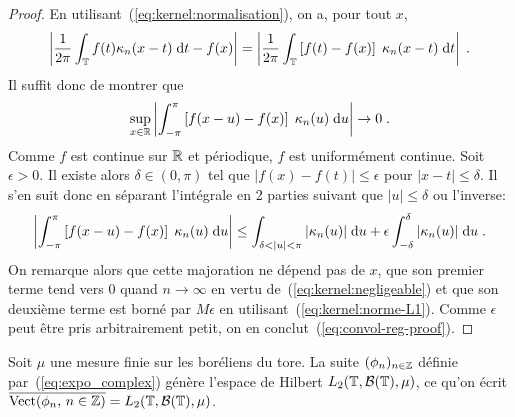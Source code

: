 \begin{proof}
  En utilisant~(\ref{eq:kernel:normalisation}), on a, pour tout $x$,
$$
\left|\frac{1}{2 \pi} \int_{\mathbb{T}} f(t) \kappa_n(x-t)\;  \mathrm{d} t - f(x)\right|
=\left|\frac{1}{2 \pi} \int_{\mathbb{T}} \left[f(t) - f(x)\right] \;\kappa_n(x-t)\;  \mathrm{d}
  t\right| \;.
$$
Il suffit donc de montrer que
\begin{equation}
\label{eq:convol-reg-proof}
\sup_{x\in\mathbb{R}}\left|\int_{-\pi}^{\pi}
\left[f(x-u) - f(x)\right] \;\kappa_n(u)\;  \mathrm{d} u\right|\to0\;.
\end{equation}
Comme $f$ est continue sur $\mathbb{R}$ et p\'{e}riodique, $f$ est uniform\'{e}ment
continue. Soit $\epsilon>0$. Il existe alors $\delta\in(0,\pi)$ tel que
$|f(x)-f(t)|\leq \epsilon$ pour $|x-t|\leq\delta$. Il s'en suit donc en
s\'{e}parant l'int\'{e}grale en 2 parties suivant que $|u|\leq\delta$ ou l'inverse:
$$
\left|\int_{-\pi}^{\pi}
\left[f(x-u) - f(x)\right] \;\kappa_n(u)\;  \rmd u\right|
\leq \int_{\delta<|u|<\pi} |\kappa_n(u)|\;  \rmd u
+ \epsilon\int_{-\delta}^\delta |\kappa_n(u)|\;  \rmd u \;.
$$
On remarque alors que cette majoration ne d\'{e}pend pas de $x$, que son premier
terme tend vers 0 quand $n\to\infty$ en vertu de~(\ref{eq:kernel:negligeable})
et que son deuxi\`{e}me terme est born\'{e} par $M\epsilon$ en
utilisant~(\ref{eq:kernel:norme-L1}). Comme $\epsilon$ peut \^{e}tre pris
arbitrairement petit, on en conclut~(\ref{eq:convol-reg-proof}).

\end{proof}
\begin{corollary}
Soit $\mu$ une mesure finie sur les bor\'{e}liens du tore.
La suite $(\phi_n)_{n\in\mathbb{Z}}$ d\'{e}finie par~(\ref{eq:expo_complex}) g\'{e}n\`{e}re
l'espace de Hilbert $L_2(\mathbb{T},\mathcal{B}(\mathbb{T}),\mu)$, ce qu'on \'{e}crit
$\overline{\mathrm{Vect}(\phi_n,\,n\in\mathbb{Z})}=L_2(\mathbb{T},\mathcal{B}(\mathbb{T}),\mu)$.
\end{corollary}
